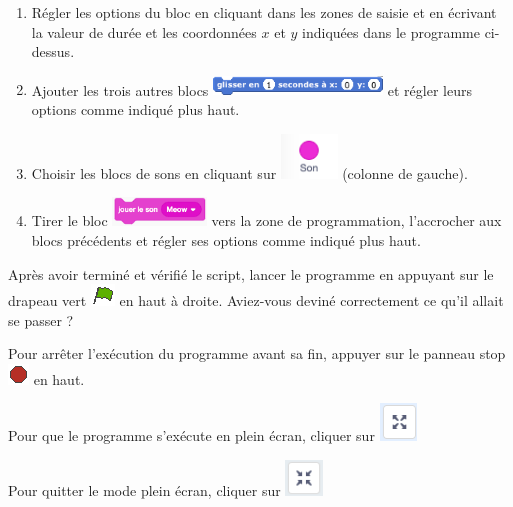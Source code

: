 \begin{enumerate}
\item Régler les options du bloc en cliquant dans les zones de saisie et en écrivant la valeur de durée et les coordonnées $x$ et $y$ indiquées dans le programme ci-dessus.
\item Ajouter les trois autres blocs \includegraphics[width=4.5cm]{./images/scratch/BlocGlisser} et régler leurs options comme indiqué plus haut.
\item Choisir les blocs de sons en cliquant sur \includegraphics[width=1.5cm]{./images/scratch/son.png} (colonne de gauche).
\item Tirer le bloc \includegraphics[width=2.5cm]{./images/scratch/meow.png} vers la zone de programmation, l'accrocher aux blocs précédents et régler ses options comme indiqué plus haut.
\end{enumerate}

\vspace{12pt}

Après avoir terminé et vérifié le script, lancer le programme en appuyant sur le drapeau vert \includegraphics[width=.7cm]{./images/scratch/DrapeauVert} en haut à droite. Aviez-vous deviné correctement ce qu'il allait se passer ?

Pour arrêter l'exécution du programme avant sa fin, appuyer sur le panneau stop \includegraphics[width=.7cm]{./images/scratch/Stop} en haut.

Pour que le programme s'exécute en plein écran, cliquer sur \includegraphics[width=1cm]{./images/scratch/pleinEcran.png}

Pour quitter le mode plein écran, cliquer sur \includegraphics[width=1cm]{./images/scratch/quitterPleinEcran.png}








